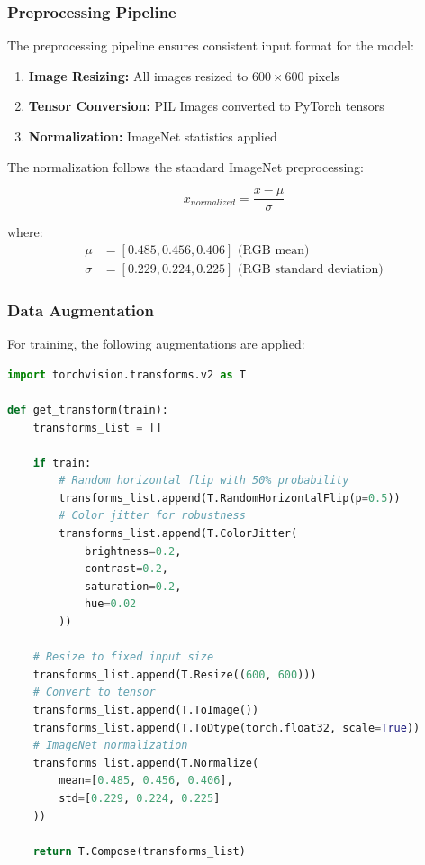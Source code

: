 \documentclass[12pt,a4paper]{article}
\begin{document}
\subsubsection{Preprocessing Pipeline}

The preprocessing pipeline ensures consistent input format for the model:

\begin{enumerate}
    \item \textbf{Image Resizing:} All images resized to $600 \times 600$ pixels
    \item \textbf{Tensor Conversion:} PIL Images converted to PyTorch tensors
    \item \textbf{Normalization:} ImageNet statistics applied
\end{enumerate}

The normalization follows the standard ImageNet preprocessing:

\begin{equation}
    x_{normalized} = \frac{x - \mu}{\sigma}
\end{equation}

where:
\begin{align}
    \mu &= [0.485, 0.456, 0.406] \text{ (RGB mean)} \\
    \sigma &= [0.229, 0.224, 0.225] \text{ (RGB standard deviation)}
\end{align}

\subsubsection{Data Augmentation}

For training, the following augmentations are applied:

\begin{lstlisting}[language=python, caption=Data Augmentation Pipeline]
import torchvision.transforms.v2 as T

def get_transform(train):
    transforms_list = []
    
    if train:
        # Random horizontal flip with 50% probability
        transforms_list.append(T.RandomHorizontalFlip(p=0.5))
        # Color jitter for robustness
        transforms_list.append(T.ColorJitter(
            brightness=0.2, 
            contrast=0.2, 
            saturation=0.2, 
            hue=0.02
        ))
    
    # Resize to fixed input size
    transforms_list.append(T.Resize((600, 600)))
    # Convert to tensor
    transforms_list.append(T.ToImage())
    transforms_list.append(T.ToDtype(torch.float32, scale=True))
    # ImageNet normalization
    transforms_list.append(T.Normalize(
        mean=[0.485, 0.456, 0.406], 
        std=[0.229, 0.224, 0.225]
    ))
    
    return T.Compose(transforms_list)
\end{lstlisting}
\end{document}
